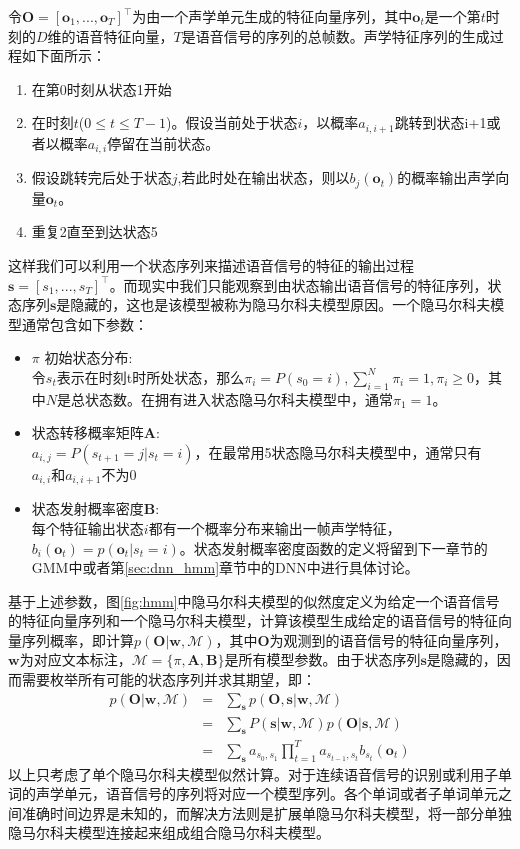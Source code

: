 令$\mathbf{O}=[\mathbf{o}_1, ..., \mathbf{o}_T]^\top$为由一个声学单元生成的特征向量序列，其中$\mathbf{o}_t$是一个第$t$时刻的$D$维的语音特征向量，$T$是语音信号的序列的总帧数。声学特征序列的生成过程如下面所示：
\begin{enumerate}
    \item 在第0时刻从状态1开始
    \item 在时刻$t$($0 \le t \le T-1$)。假设当前处于状态$i$，以概率$a_{i,i+1}$跳转到状态i+1或者以概率$a_{i,i}$停留在当前状态。
    \item 假设跳转完后处于状态$j$,若此时处在输出状态，则以$b_j(\mathbf{o}_t)$的概率输出声学向量$\mathbf{o}_t$。
    \item 重复2直至到达状态5
\end{enumerate}

这样我们可以利用一个状态序列来描述语音信号的特征的输出过程$\mathbf{s}=[s_1, ..., s_T]^\top$。而现实中我们只能观察到由状态输出语音信号的特征序列，状态序列$\mathbf{s}$是隐藏的，这也是该模型被称为隐马尔科夫模型原因。一个隐马尔科夫模型通常包含如下参数：
\begin{itemize}
    \item $\pi$ 初始状态分布: \\
    令$s_t$表示在时刻t时所处状态，那么$\pi_i = P(s_0=i), \sum_{i=1}^N \pi_i = 1, \pi_i \ge 0$，其中$N$是总状态数。在拥有进入状态隐马尔科夫模型中，通常$\pi_1=1$。
    \item 状态转移概率矩阵$\mathbf{A}$: \\
    $a_{i,j}=P(s_{t+1}=j|s_t=i)$，在最常用5状态隐马尔科夫模型中，通常只有$a_{i,i}和a_{i,i+1}$不为0
    \item 状态发射概率密度$\mathbf{B}$: \\
    每个特征输出状态$i$都有一个概率分布来输出一帧声学特征，$b_i(\mathbf{o}_t)=p(\mathbf{o}_t|s_t=i)$。状态发射概率密度函数的定义将留到下一章节的GMM中或者第\ref{sec:dnn_hmm}章节中的DNN中进行具体讨论。
\end{itemize}

基于上述参数，图\ref{fig:hmm}中隐马尔科夫模型的似然度定义为给定一个语音信号的特征向量序列和一个隐马尔科夫模型，计算该模型生成给定的语音信号的特征向量序列概率，即计算$p(\mathbf{O}|\mathbf{w},\mathcal{M})$，其中$\mathbf{O}$为观测到的语音信号的特征向量序列，$\mathbf{w}$为对应文本标注，$\mathcal{M}=\{\pi, \mathbf{A}, \mathbf{B}\}$是所有模型参数。由于状态序列$\mathbf{s}$是隐藏的，因而需要枚举所有可能的状态序列并求其期望，即：
\begin{eqnarray}
\label{eq:hmm-basic}
p(\mathbf{O}|\mathbf{w},\mathcal{M}) &=& \sum_{\mathbf{s}}p(\mathbf{O},\mathbf{s}|\mathbf{w},\mathcal{M}) \\
&=& \sum_{\mathbf{s}} P(\mathbf{s}|\mathbf{w},\mathcal{M})p(\mathbf{O}|\mathbf{s},\mathcal{M}) \\
&=& \sum_{\mathbf{s}} a_{s_0, s_1}\prod_{t=1}^T a_{s_{t-1}, s_t}b_{s_t}(\mathbf{o}_t)
\end{eqnarray}
以上只考虑了单个隐马尔科夫模型似然计算。对于连续语音信号的识别或利用子单词的声学单元，语音信号的序列将对应一个模型序列。各个单词或者子单词单元之间准确时间边界是未知的，而解决方法则是扩展单隐马尔科夫模型，将一部分单独隐马尔科夫模型连接起来组成组合隐马尔科夫模型。

